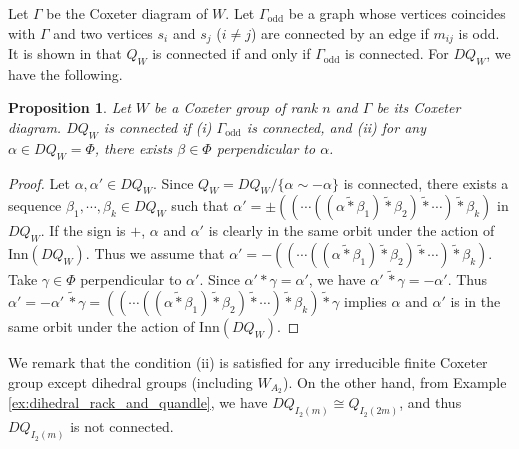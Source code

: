 \documentclass{amsart}
\newtheorem{proposition}[theorem]{Proposition}
\theoremstyle{definition}
\theoremstyle{remark}
\numberwithin{equation}{section}
\begin{document}
Let $\Gamma$ be the Coxeter diagram of $W$.
Let $\Gamma_{\mathrm{odd}}$ be a graph 
whose vertices coincides with $\Gamma$ and two vertices $s_i$ and $s_j$  ($i \neq j$)
are connected by an edge if $m_{i j}$ is odd.
It is shown in \cite[Proposition 2.1]{Akita} that
$Q_W$ is connected if and only if $\Gamma_{\mathrm{odd}}$ is connected. 
For $DQ_W$, we have the following.

\begin{proposition}
Let $W$ be a Coxeter group of rank $n$ and $\Gamma$ be its Coxeter diagram.
$DQ_W$ is connected if \textup{(i)} $\Gamma_{\mathrm{odd}}$ is connected,  and 
\textup{(ii)} for any $\alpha \in DQ_W = \Phi$, there exists $\beta \in \Phi$ 
perpendicular to $\alpha$. 
\end{proposition}
\begin{proof}
Let $\alpha, \alpha' \in DQ_W$.
Since $Q_W = DQ_W /  \{ \alpha \sim - \alpha \}$ is connected, 
there exists a sequence $\beta_1, \cdots , \beta_k \in DQ_W$ such that 
$\alpha' 
= \pm ( ( \cdots  ( (\alpha \widetilde{*} \beta_1) \widetilde{*} \beta_2 ) 
\widetilde{*} \cdots ) \widetilde{*} \beta_k ) $ in $DQ_{W}$.
If the sign is $+$, $\alpha$ and $\alpha'$ is clearly in the same orbit under 
the action of $\mathrm{Inn} (DQ_W)$.
Thus we assume that $\alpha'
= - ( ( \cdots  ( (\alpha \widetilde{*} \beta_1) \widetilde{*} \beta_2 ) 
\widetilde{*} \cdots ) \widetilde{*} \beta_k )$.
Take $\gamma \in \Phi$ perpendicular to $\alpha'$.
Since $\alpha' * \gamma = \alpha'$, we have $\alpha' \, \widetilde{*} \gamma = -\alpha'$.
Thus
$\alpha' = - \alpha' \, \widetilde{*} \gamma
= ( ( \cdots  ( (\alpha \widetilde{*} \beta_1) \widetilde{*} \beta_2 ) 
\widetilde{*} \cdots ) \widetilde{*} \beta_k ) \widetilde{*} \gamma$ 
implies $\alpha$ and $\alpha'$ is in the same orbit under 
the action of $\mathrm{Inn} (DQ_W)$.
\end{proof}

We remark that the condition (ii) is satisfied for any irreducible finite Coxeter group 
except dihedral groups (including $W_{A_2}$).
On the other hand, 
from Example \ref{ex:dihedral_rack_and_quandle},
we have $DQ_{I_2 (m)} \cong Q_{I_2 (2m)}$, and thus $DQ_{I_2 (m)}$ is not connected.
\end{document}
